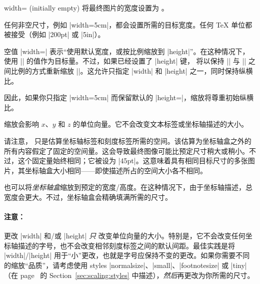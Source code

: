 \begin{pgfplotskey}{width= (initially empty)}
    将最终图片的宽度设置为 。

    任何非空尺寸，例如 |width=5cm|，都会设置所需的目标宽度。任何 \TeX{} 单位都被接受（例如 |200pt| 或 |5in|）。

    空值 |width={}| 表示“使用默认宽度，或按比例缩放到 |height|”。在这种情况下，\PGFPlots{} 使用 |\axisdefaultwidth| 的值作为目标量。不过，如果已经设置了 |height| 键，\PGFPlots{} 将以保持 |\axisdefaultwidth| 与 |\axisdefaultheight| 之间比例的方式重新缩放 |\axisdefaultwidth|。这允许只指定 |width| 和 |height| 之一，同时保持纵横比。

    因此，如果你只指定 |width=5cm| 而保留默认的 |height={}|，缩放将尊重初始纵横比。

    缩放会影响 $x$、$y$ 和 $z$ 的单位向量。它不会改变文本标签或坐标轴描述的大小。
\begin{codeexample}[]
\end{codeexample}

    请注意，\PGFPlots{} 只是估算坐标轴标签和刻度标签所需的空间。该估算为坐标轴盒之外的所有内容假定了固定的空间量。这会导致最终图像可能比预定尺寸稍大或稍小。不过，这个固定量始终相同；它被设为 |45pt|。这意味着具有相同目标尺寸的多张图片，其坐标轴盒大小相同——即使描述所占的空间大小各不相同。

    也可以将\emph{坐标轴盒}缩放到预定的宽度/高度。在这种情况下，由于坐标轴描述，总宽度会更大。不过，坐标轴盒会精确填满所需的尺寸。
\begin{codeexample}[]
\end{codeexample}

    \paragraph{注意：}

    更改 |width| 和/或 |height| \emph{只} 改变单位向量的大小。特别是，它不会改变任何坐标轴描述的字号，也不会改变相邻刻度标签之间的默认间距。最佳实践是将 |width|/|height| 用于“小”更改，也就是字号应保持不变的更改。如果你需要不同的缩放“品质”，请考虑使用 styles |normalsize|、|small|、|footnotesize| 或 |tiny|（在 page~\pageref{sec:scaling:styles} 的 Section~\ref{sec:scaling:styles} 中描述），\emph{然后}再更改为你所需的尺寸。


\end{pgfplotskey}
